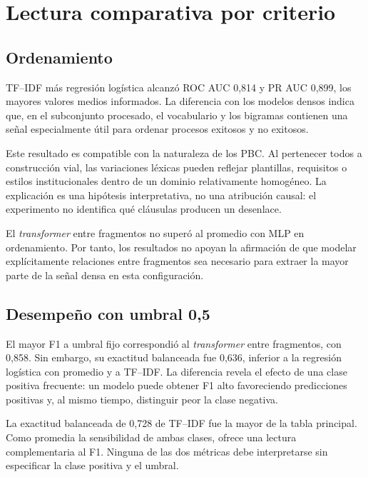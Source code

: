 

\section{Lectura comparativa por criterio}

\subsection{Ordenamiento}

TF--IDF más regresión logística alcanzó ROC AUC 0,814 y PR AUC 0,899, los mayores valores medios informados. La diferencia con los modelos densos indica que, en el subconjunto procesado, el vocabulario y los bigramas contienen una señal especialmente útil para ordenar procesos exitosos y no exitosos.

Este resultado es compatible con la naturaleza de los PBC. Al pertenecer todos a construcción vial, las variaciones léxicas pueden reflejar plantillas, requisitos o estilos institucionales dentro de un dominio relativamente homogéneo. La explicación es una hipótesis interpretativa, no una atribución causal: el experimento no identifica qué cláusulas producen un desenlace.

El \textit{transformer} entre fragmentos no superó al promedio con MLP en ordenamiento. Por tanto, los resultados no apoyan la afirmación de que modelar explícitamente relaciones entre fragmentos sea necesario para extraer la mayor parte de la señal densa en esta configuración.

\subsection{Desempeño con umbral 0,5}

El mayor F1 a umbral fijo correspondió al \textit{transformer} entre fragmentos, con 0,858. Sin embargo, su exactitud balanceada fue 0,636, inferior a la regresión logística con promedio y a TF--IDF. La diferencia revela el efecto de una clase positiva frecuente: un modelo puede obtener F1 alto favoreciendo predicciones positivas y, al mismo tiempo, distinguir peor la clase negativa.

La exactitud balanceada de 0,728 de TF--IDF fue la mayor de la tabla principal. Como promedia la sensibilidad de ambas clases, ofrece una lectura complementaria al F1. Ninguna de las dos métricas debe interpretarse sin especificar la clase positiva y el umbral.

